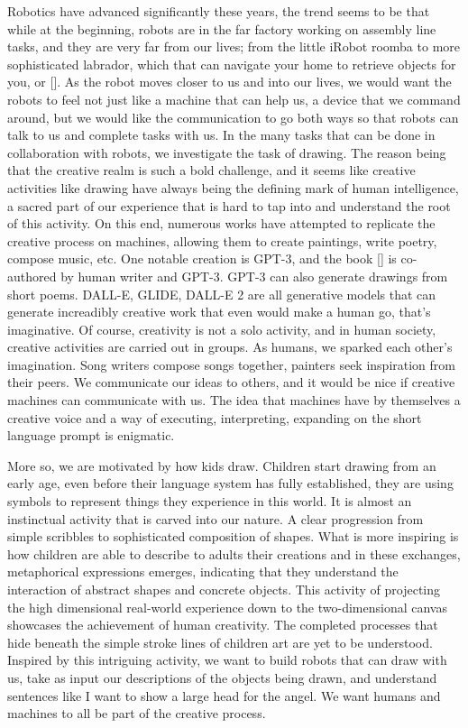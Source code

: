 
 
Robotics have advanced significantly these years, the trend seems to be that while at the beginning, robots are in the far factory working on assembly line tasks, and they are very far from our lives; from the little iRobot roomba to more sophisticated labrador, which that can navigate your home to retrieve objects for you, or []. As the robot moves closer to us and into our lives, we would want the robots to feel not just like a machine that can help us, a device that we command around, but we would like the communication to go both ways so that robots can talk to us and complete tasks with us. In the many tasks that can be done in collaboration with robots, we investigate the task of drawing. The reason being that the creative realm is such a bold challenge, and it seems like creative activities like drawing have always being the defining mark of human intelligence, a sacred part of our experience that is hard to tap into and understand the root of this activity. On this end, numerous works have attempted to replicate the creative process on machines, allowing them to create paintings, write poetry, compose music, etc. One notable creation is GPT-3, and the book [] is co-authored by human writer and GPT-3. GPT-3 can also generate drawings from short poems. DALL-E, GLIDE, DALL-E 2 are all generative models that can generate increadibly creative work that even would make a human go, that's imaginative. Of course, creativity is not a solo activity, and in human society, creative activities are carried out in groups. As humans, we sparked each other's imagination. Song writers compose songs together, painters seek inspiration from their peers. We communicate our ideas to others, and it would be nice if creative machines can communicate with us. The idea that machines have by themselves a creative voice and a way of executing, interpreting, expanding on the short language prompt is enigmatic.  

More so, we are motivated by how kids draw. Children start drawing from an early age, even before their language system has fully established, they are using symbols to represent things they experience in this world. It is almost an instinctual activity that is carved into our nature. A clear progression from simple scribbles to sophisticated composition of shapes. What is more inspiring is how children are able to describe to adults their creations and in these exchanges, metaphorical expressions emerges, indicating that they understand the interaction of abstract shapes and concrete objects. This activity of projecting the high dimensional real-world experience down to the two-dimensional canvas showcases the achievement of human creativity. The completed processes that hide beneath the simple stroke lines of children art are yet to be understood. Inspired by this intriguing activity, we want to build robots that can draw with us, take as input our descriptions of the objects being drawn, and understand sentences like I want to show a large head for the angel. We want humans and machines to all be part of the creative process.   

